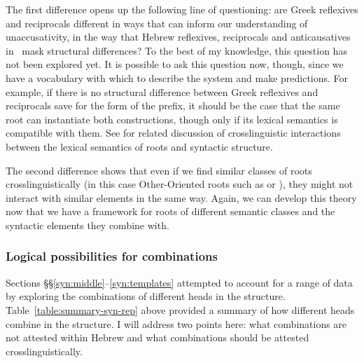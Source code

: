 The first difference opens up the following line of questioning: are Greek reflexives and reciprocals different in ways that can inform our understanding of unaccusativity, in the way that Hebrew reflexives, reciprocals and anticausatives in \thit~mask structural differences? To the best of my knowledge, this question has not been explored yet. It is possible to ask this question now, though, since we have a vocabulary with which to describe the system and make predictions. For example, if there is no structural difference between Greek reflexives and reciprocals save for the form of the prefix, it should be the case that the same root can instantiate both constructions, though only if its lexical semantics is compatible with them. See \cite{alexiadouborerschaefer14} for related discussion of crosslinguistic interactions between the lexical semantics of roots and syntactic structure.

The second difference shows that even if we find similar classes of roots crosslinguistically (in this case Other-Oriented roots such as  or ), they might not interact with similar elements in the same way. Again, we can develop this theory now that we have a framework for roots of different semantic classes and the syntactic elements they combine with.



	\subsubsection{Logical possibilities for combinations} \label{syn:crosslx:combinatorics}
Sections \S\S\ref{syn:middle}--\ref{syn:templates} attempted to account for a range of data by exploring the combinations of different heads in the structure. Table~\ref{table:summary-syn-rep} above provided a summary of how different heads combine in the structure. I will address two points here: what combinations are not attested within Hebrew and what combinations should be attested crosslinguistically.

